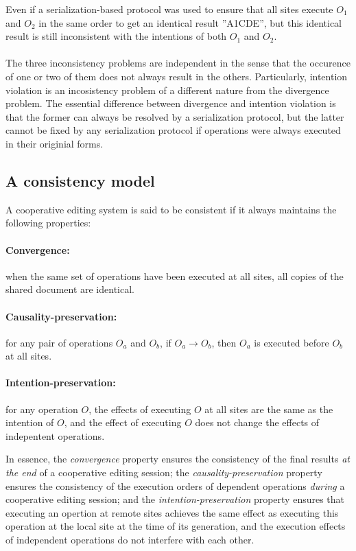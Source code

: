 \documentclass[11pt,a4paper]{article}
\begin{document}
Even if a serialization-based protocol was used to ensure that all sites execute $O_{1}$ and $O_{2}$ in the same order to get an identical result ''A1CDE'', but this identical result is still inconsistent with the intentions of both $O_{1}$ and $O_{2}$.

\paragraph{} 
The three inconsistency problems are independent in the sense that the occurence of one or two of them does not always result in the others. Particularly, intention violation is an incosistency problem of a different nature from the divergence problem. The essential difference between divergence and intention violation is that the former can always be resolved by a serialization protocol, but the latter cannot be fixed by any serialization protocol if operations were always executed in their originial forms.


\subsection{A consistency model}
A cooperative editing system is said to be consistent if it always maintains the following properties:
\paragraph{Convergence:} when the same set of operations have been executed at all sites, all copies of the shared document are identical.
\paragraph{Causality-preservation:} for any pair of operations $O_a$ and $O_b$, if $O_a \rightarrow O_b$, then $O_a$ is executed before $O_b$ at all sites.
\paragraph{Intention-preservation:} for any operation $O$, the effects of executing $O$ at all sites are the same as the intention of $O$, and the effect of executing $O$ does not change the effects of indepentent operations.

{\setlength{\parskip}{18pt}
In essence, the \emph{convergence} property ensures the consistency of the final results \emph{at the end} of a cooperative editing session; the \emph{causality-preservation} property ensures the consistency of the execution orders of dependent operations \emph{during} a cooperative editing session; and the \emph{intention-preservation} property ensures that executing an opertion at remote sites achieves the same effect as executing this operation at the local site at the time of its generation, and the execution effects of independent operations do not interfere with each other.
}
\end{document}
